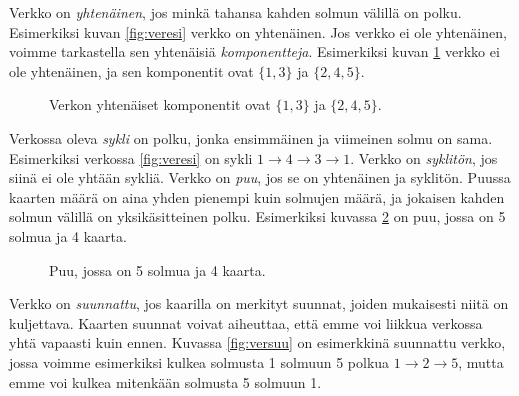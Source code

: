 Verkko on \emph{yhtenäinen}, jos minkä tahansa
kahden solmun välillä on polku.
Esimerkiksi kuvan \ref{fig:veresi} verkko on yhtenäinen.
Jos verkko ei ole yhtenäinen, voimme tarkastella
sen yhtenäisiä \emph{komponentteja}.
Esimerkiksi kuvan \ref{fig:veryht} verkko ei ole yhtenäinen,
ja sen komponentit ovat $\{1,3\}$ ja $\{2,4,5\}$.

\begin{figure}
\center
\begin{center}
\end{center}
\caption{Verkon yhtenäiset komponentit ovat $\{1,3\}$ ja $\{2,4,5\}$.}
\label{fig:veryht}
\end{figure}

Verkossa oleva \emph{sykli} on polku, jonka ensimmäinen ja viimeinen
solmu on sama.
Esimerkiksi verkossa \ref{fig:veresi} on sykli
$1 \rightarrow 4 \rightarrow 3 \rightarrow 1$.
Verkko on \emph{syklitön}, jos siinä ei ole yhtään sykliä.
Verkko on \emph{puu}, jos se on yhtenäinen ja syklitön.
Puussa kaarten määrä on aina yhden pienempi kuin solmujen määrä,
ja jokaisen kahden solmun välillä on yksikäsitteinen polku.
Esimerkiksi kuvassa \ref{fig:verpuu} on puu, jossa on 5 solmua ja 4 kaarta.

\begin{figure}
\center
\begin{center}
\end{center}
\caption{Puu, jossa on 5 solmua ja 4 kaarta.}
\label{fig:verpuu}
\end{figure}

Verkko on \emph{suunnattu}, jos kaarilla on merkityt suunnat,
joiden mukaisesti niitä on kuljettava.
Kaarten suunnat voivat aiheuttaa, että emme voi liikkua
verkossa yhtä vapaasti kuin ennen.
Kuvassa \ref{fig:versuu} on esimerkkinä suunnattu verkko,
jossa voimme esimerkiksi kulkea solmusta 1 solmuun 5
polkua $1 \rightarrow 2 \rightarrow 5$,
mutta emme voi kulkea mitenkään solmusta 5 solmuun 1.

